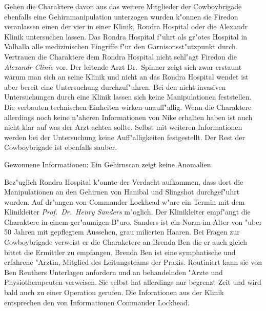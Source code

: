 
Gehen die Charaktere davon aus das weitere Mitglieder der Cowboybrigade ebenfalls eine Gehirnmanipulation unterzogen wurden k"onnen sie Firedon veranlassen einen der vier in einer Klinik, Rondra Hospital oder die Alexandr Klinik untersuchen lassen. Das Rondra Hospital f"uhrt als gr"o\3tes Hospital in Valhalla alle medizinischen Eingriffe f"ur den Garnisonsst"utzpunkt durch. Vertrauen die Charaktere dem Rondra Hospital nicht schl"agt Firedon die \emph{Alexandr Clinic} vor. Der leitende Arzt Dr.~Spinner zeigt sich zwar erstaunt warum man sich an seine Klinik und nicht an das Rondra Hospital wendet ist aber bereit eine Untersuchung durchzuf"uhren. Bei den nicht invasiven Untersuchungen durch eine Klinik lassen sich keine Manipulationen feststellen. Die verbauten technischen Einheiten wirken unauff"allig. Wenn die Charaktere allerdings noch keine n"aheren Informationen von Nike erhalten haben ist auch nicht klar auf was der Arzt achten sollte. Selbst mit weiteren Informationen werden bei der Untersuchung keine Auff"alligkeiten festgestellt. Der Rest der Cowboybrigade ist ebenfalls sauber.

\begin{remarks}
	Gewonnene Informationen: Ein Gehirnscan zeigt keine Anomalien.
\end{remarks}



Bez"uglich Rondra Hospital k"onnte der Verdacht aufkommen, dass dort die Manipulationen an den Gehirnen von Hanibal und Slingshot durchgef"uhrt wurden. Auf dr"angen von Commander Lockhead w"are ein Termin mit dem Klinikleiter \emph{Prof.~Dr.~Henry Sanders} m"oglich. Der Klinikleiter empf"angt die Charaktere in einem ger"aumigen B"uro. Sanders ist ein Norm im Alter von "uber 50 Jahren mit gepflegtem Aussehen, grau milierten Haaren. Bei Fragen zur Cowboybrigade verweist er die Charaketere an Brenda Ben die er auch gleich bittet die Ermittler zu empfangen. Brenda Ben ist eine symphatische und erfahrene "Arztin, Mitglied des Leitungsteams der Praxis. Routiniert kann sie von Ben Reuthers Unterlagen anfordern und an behandelnden "Arzte und Physiotherapeuten verweisen. Sie selbst hat allerdings nur begrenzt Zeit und wird bald auch zu einer Operation gerufen. Die Inforationen aus der Klinik entsprechen den von Informationen Commander Lockhead.

